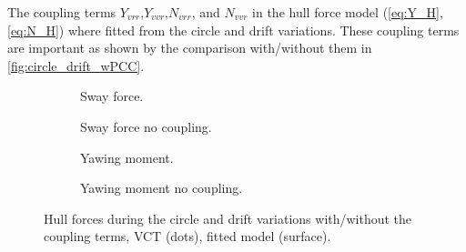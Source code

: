 The coupling terms $Y_{vrr}$,$Y_{vvr}$,$N_{vrr}$, and $N_{vvr}$ in the hull force model (\autoref{eq:Y_H}, \autoref{eq:N_H}) where fitted from the circle and drift variations. These coupling terms are important as shown by the comparison with/without them in \autoref{fig:circle_drift_wPCC}.
\begin{figure}[h]
     \centering
     \begin{subfigure}[b]{0.49\textwidth}
         \centering
         
        \caption{Sway force.}
        \label{fig:circle_drift_Y_H_wPCC}
     \end{subfigure}
     \hfill
     \begin{subfigure}[b]{0.49\textwidth}
         \centering
         
        \caption{Sway force no coupling.}
        \label{fig:circle_drift_Y_H_no_coupling_wPCC}
     \end{subfigure}

     \vfill
     \begin{subfigure}[b]{0.49\textwidth}
         \centering
         
        \caption{Yawing moment.}
        \label{fig:circle_drift_N_H_wPCC}
     \end{subfigure}
     \hfill
     \begin{subfigure}[b]{0.49\textwidth}
         \centering
         
        \caption{Yawing moment no coupling.}
        \label{fig:circle_drift_N_H_no_coupling_wPCC}
     \end{subfigure}
     
    \caption{Hull forces during the circle and drift variations with/without the coupling terms, VCT (dots), fitted model (surface).}
    \label{fig:circle_drift_wPCC}
\end{figure}

